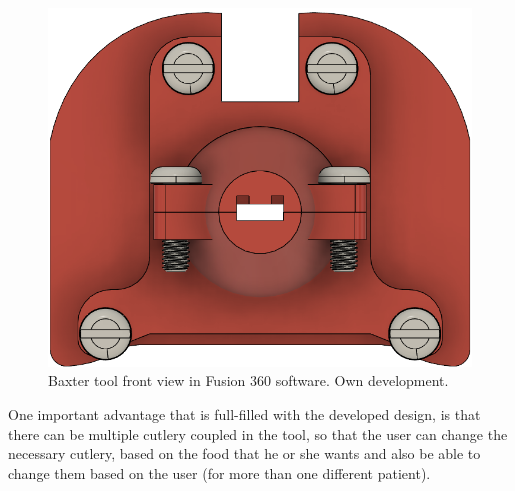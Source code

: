 \documentclass[11pt]{report} %
\begin{document}
\begin{figure}[H]
    \centering
    \includegraphics[width=0.6\linewidth]{assets/imgs/baxter_robot/baxter_spoon_fusion_front_view.png}
    \caption{Baxter tool front view in Fusion 360 software. Own development.} 
    \label{fig_baxter_tool_fusion_front_view}
\end{figure}


One important advantage that is full-filled with the developed design, is that there can be multiple cutlery coupled in the tool, so that the user can change the necessary cutlery, based on the food that he or she wants and also be able to change them based on the user (for more than one different patient).\\
\end{document}
